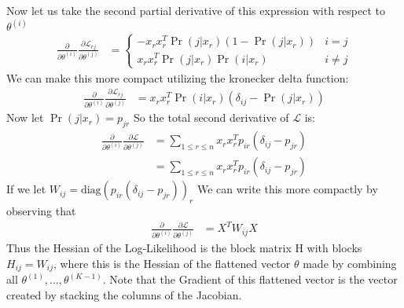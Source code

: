 \documentclass[12pt]{article}
\begin{document}
Now let us take the second partial derivative of this expression with respect to $\theta^{(i)}$
\begin{align*}
    \frac{\partial}{\partial \theta^{(i)}}\frac{\partial \mathcal{L}_{rj}}{\partial \theta^{(j)}} &= \begin{cases}
        -x_rx_r^T\Pr(j|x_r)(1 - \Pr(j|x_r)) & i = j \\
        x_rx_r^T\Pr(j|x_r)\Pr(i|x_r) & i \neq j
    \end{cases}
\end{align*}
We can make this more compact utilizing the kronecker delta function:
\begin{align*}
    \frac{\partial}{\partial \theta^{(i)}}\frac{\partial \mathcal{L}_{rj}}{\partial \theta^{(j)}} &=
    x_rx_r^T\Pr(i|x_r)(\delta_{ij} - \Pr(j|x_r))
\end{align*}
Now let $\Pr(j|x_r) = p_{jr}$ So the total second derivative of $\mathcal{L}$ is:
\begin{align*}
    \frac{\partial}{\partial \theta^{(i)}}\frac{\partial \mathcal{L}}{\partial \theta^{(j)}} &=
    \displaystyle \sum_{1 \leq r \leq n}x_rx_r^Tp_{ir}(\delta_{ij} - p_{jr}) \\
    &= \displaystyle \sum_{1 \leq r \leq n}x_rx_r^Tp_{ir}(\delta_{ij} - p_{jr})
\end{align*}
If we let $W_{ij} = \text{diag}(p_{ir}(\delta_{ij} - p_{jr}))_r$ We can write this more compactly by observing that
\begin{align*}
    \frac{\partial}{\partial \theta^{(i)}}\frac{\partial \mathcal{L}}{\partial \theta^{(j)}} &= X^TW_{ij}X
\end{align*}
Thus the Hessian of the Log-Likelihood is the block matrix H with
blocks $H_{ij} = W_{ij}$, where this is the Hessian of the flattened vector $\theta$
made by combining all $\theta^{(1)}, \ldots, \theta^{(K - 1)}$. Note that the Gradient
of this flattened vector is the vector created by stacking the columns of the Jacobian.
\end{document}
